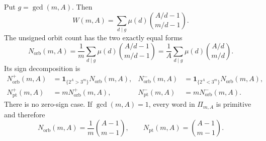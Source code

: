 \begin{theorem}
\label{thm:signed-fixed-content-necklace-count}
Put $g=\gcd(m,A)$.  Then
\begin{equation}
 W(m,A)=\sum_{d\mid g}\mu(d)
            \binom{A/d-1}{m/d-1}.
 \label{eq:primitive-packet-word-count}
\end{equation}
The unsigned orbit count has the two exactly equal forms
\begin{equation}
 N_{\mathrm{orb}}(m,A)
 =\frac1m\sum_{d\mid g}\mu(d)
            \binom{A/d-1}{m/d-1}
 =\frac1A\sum_{d\mid g}\mu(d)
            \binom{A/d}{m/d}.
 \label{eq:primitive-packet-orbit-count}
\end{equation}
Its sign decomposition is
\begin{align}
 N_{\mathrm{orb}}^{+}(m,A)
 &=\mathbf 1_{\{2^A>3^m\}}N_{\mathrm{orb}}(m,A),
 &
 N_{\mathrm{orb}}^{-}(m,A)
 &=\mathbf 1_{\{2^A<3^m\}}N_{\mathrm{orb}}(m,A),
 \label{eq:signed-packet-orbit-count}\\
 N_{\mathrm{pt}}^{+}(m,A)
 &=mN_{\mathrm{orb}}^{+}(m,A),
 &
 N_{\mathrm{pt}}^{-}(m,A)
 &=mN_{\mathrm{orb}}^{-}(m,A).
 \label{eq:signed-packet-point-count}
\end{align}
There is no zero-sign case.  If $\gcd(m,A)=1$, every word in
$\Pi_{m,A}$ is primitive and therefore
\begin{equation}
 N_{\mathrm{orb}}(m,A)=\frac1m\binom{A-1}{m-1},
 \qquad
 N_{\mathrm{pt}}(m,A)=\binom{A-1}{m-1}.
 \label{eq:coprime-packet-orbit-count}
\end{equation}
\end{theorem}

